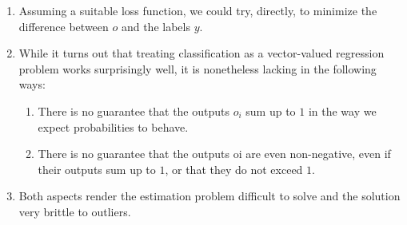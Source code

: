 \begin{enumerate}[itemsep=0.2cm]
    \item Assuming a suitable loss function, we could try, directly, to minimize the difference between $o$ and the labels $y$.

    \item While it turns out that treating classification as a vector-valued regression problem works surprisingly well, it is nonetheless lacking in the following ways:
    \begin{enumerate}
        \item There is no guarantee that the outputs $o_i$ sum up to $1$ in the way we expect probabilities to behave.

        \item There is no guarantee that the outputs oi are even non-negative, even if their outputs sum up to $1$, or that they do not exceed $1$.

    \end{enumerate}

    \item Both aspects render the estimation problem difficult to solve and the solution very brittle to outliers.

\end{enumerate}










































